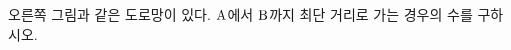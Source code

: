 \noindent\begin{minipage}[t]{0.58\linewidth}\vspace{0pt}\raggedright 오른쪽 그림과 같은 도로망이 있다. $\mathrm{A}$에서 $\mathrm{B}$까지 최단 거리로 가는 경우의 수를 구하시오.\end{minipage}\hfill\begin{minipage}[t]{0.4\linewidth}\vspace{0pt}\centering \resizebox{\ifdim\width>\linewidth\linewidth\else\width\fi}{!}{}\end{minipage}\par
